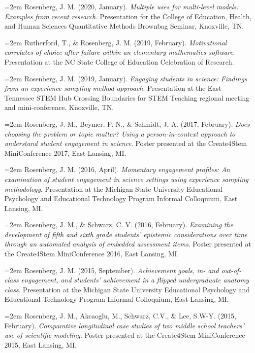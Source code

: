 \documentclass[
  14,
]{article}
\begin{document}
\hangindent=2em Rosenberg, J. M. (2020, January). \emph{Multiple uses
for multi-level models: Examples from recent research}. Presentation for
the College of Education, Health, and Human Sciences Quantitative
Methods Brownbag Seminar, Knoxville, TN.

\hangindent=2em Rutherford, T., \& Rosenberg, J. M. (2019, February).
\emph{Motivational correlates of choice after failure within an
elementary mathematics software}. Presentation at the NC State College
of Education Celebration of Research.

\hangindent=2em Rosenberg, J. M. (2019, January). \emph{Engaging
students in science: Findings from an experience sampling method
approach}. Presentation at the East Tennessee STEM Hub Crossing
Boundaries for STEM Teaching regional meeting and mini-conference.
Knoxville, TN.

\hangindent=2em Rosenberg, J. M., Beymer, P. N., \& Schmidt, J. A.
(2017, February). \emph{Does choosing the problem or topic matter? Using
a person-in-context approach to understand student engagement in
science}. Poster presented at the Create4Stem MiniConference 2017, East
Lansing, MI.

\hangindent=2em Rosenberg, J. M. (2016, April). \emph{Momentary
engagement profiles: An examination of student engagement in science
settings using experience sampling methodology}. Presentation at the
Michigan State University Educational Psychology and Educational
Technology Program Informal Colloquium, East Lansing, MI.

\hangindent=2em Rosenberg, J. M., \& Schwarz, C. V. (2016, February).
\emph{Examining the development of fifth and sixth grade students'
epistemic considerations over time through an automated analysis of
embedded assessment items}. Poster presented at the Create4Stem
MiniConference 2016, East Lansing, MI.

\hangindent=2em Rosenberg, J. M. (2015, September). \emph{Achievement
goals, in- and out-of-class engagement, and students' achievement in a
flipped undergraduate anatomy class}. Presentation at the Michigan State
University Educational Psychology and Educational Technology Program
Informal Colloquium, East Lansing, MI.

\hangindent=2em Rosenberg, J. M., Akcaoglu, M., Schwarz, C.V., \& Lee,
S.W-Y. (2015, February). \emph{Comparative longitudinal case studies of
two middle school teachers' use of scientific modeling}. Poster
presented at the Create4Stem MiniConference 2015, East Lansing, MI.
\end{document}

